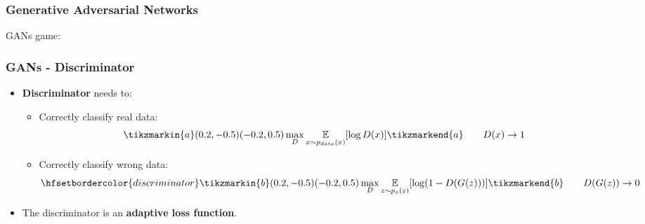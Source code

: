 \documentclass{beamer}
\begin{document}
\begin{frame}
\frametitle{Generative Adversarial Networks}
GANs game:


\end{frame}

\begin{frame}
\frametitle{GANs - Discriminator}
\begin{itemize}
\item \textbf{Discriminator} needs to:
\begin{itemize}
\item Correctly classify \textcolor{real}{real} data: \\ 
\begin{equation}
\tikzmarkin{a}(0.2,-0.5)(-0.2,0.5)
\max_D \underset{x \sim p_{data}(x)}{\mathbb{E}} [\log D(x)]
\tikzmarkend{a}
\tag*{$D(x) \rightarrow 1$}
\end{equation}
\item Correctly classify \textcolor{generated}{wrong} data: \\ 
\begin{equation}
\hfsetbordercolor{discriminator} \tikzmarkin{b}(0.2,-0.5)(-0.2,0.5)
\max_D  \underset{z \sim p_z(z)}{\mathbb{E}}[\log(1 - D(G(z)))]
\tikzmarkend{b}
\tag*{$D(G(z)) \rightarrow 0$}
\end{equation}
\end{itemize}
\item The discriminator is an \textbf{adaptive loss function}.
\end{itemize}
\end{frame}
\end{document}
